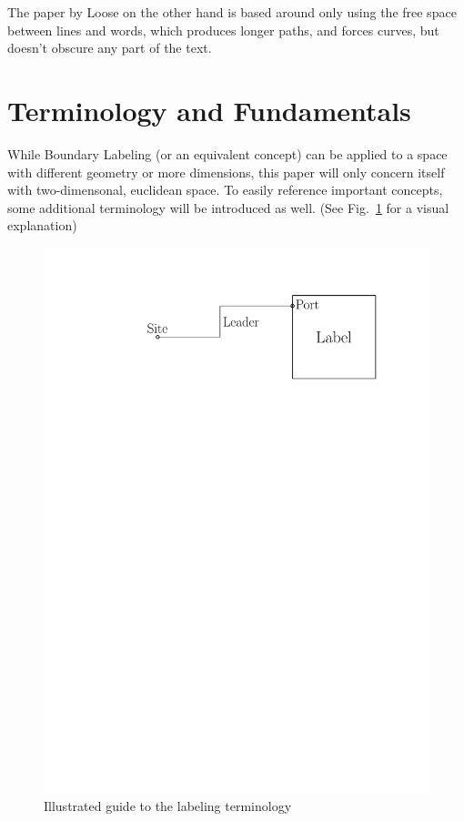 \documentclass[11pt,a4paper]{article}
\begin{document}
The paper by Loose\cite{Loose2015} on the other hand is based around only using the free space between lines and words, which produces longer paths, and forces curves, but doesn't obscure any part of the text.



\section{Terminology and Fundamentals} %
While Boundary Labeling (or an equivalent concept) can be applied to a space with different geometry or more dimensions, this paper will only concern itself with two-dimensonal, euclidean space.
To easily reference important concepts, some additional terminology will be introduced as well. (See Fig.~\ref{fig:term} for a visual explanation)%

\begin{figure}%
 \captionsetup{justification=centering, margin=0.75cm}
 \centering
  \includegraphics[scale=0.5]{IPE_TerminologyDrawing.pdf}
  \caption{Illustrated guide to the labeling terminology}
 \label{fig:term}
\end{figure}
\end{document}
